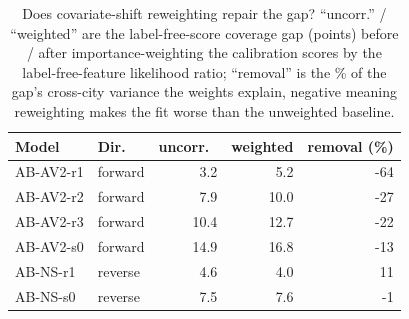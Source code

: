 \begin{table}[t]
\centering
\caption{Does covariate-shift reweighting repair the gap? ``uncorr.'' / ``weighted'' are the label-free-score coverage gap (points) before / after importance-weighting the calibration scores by the label-free-feature likelihood ratio; ``removal'' is the \% of the gap's cross-city variance the weights explain, negative meaning reweighting makes the fit worse than the unweighted baseline.}
\label{tab:reweight}
\begin{tabular}{llrrr}
\toprule
Model & Dir. & uncorr.\ & weighted & removal (\%) \\
\midrule
AB-AV2-r1 & forward & 3.2 & 5.2 & -64 \\
AB-AV2-r2 & forward & 7.9 & 10.0 & -27 \\
AB-AV2-r3 & forward & 10.4 & 12.7 & -22 \\
AB-AV2-s0 & forward & 14.9 & 16.8 & -13 \\
AB-NS-r1 & reverse & 4.6 & 4.0 & 11 \\
AB-NS-s0 & reverse & 7.5 & 7.6 & -1 \\
\bottomrule
\end{tabular}
\end{table}
